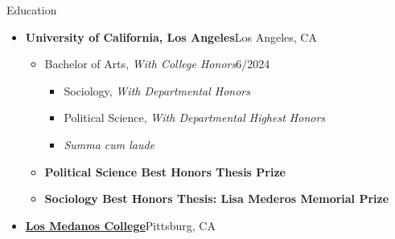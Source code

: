 \documentclass[12pt]{resume} %
\begin{document}
\begin{rSection}{Education}
\begin{itemize}[leftmargin=0em, itemsep=0pt]
\item[] \textbf{University of California, Los Angeles}\hfill{}Los Angeles, CA
\begin{itemize}[leftmargin=1em, itemsep=0pt]
    \item[] Bachelor of Arts, \textit{With College Honors}\hfill{}6/2024
    \begin{itemize}[leftmargin=1em, itemsep=0pt]
        \item[] Sociology, \textit{With Departmental Honors}
        \item[] Political Science, \textit{With Departmental Highest Honors}
    \item[] \textit{Summa cum laude}
    \end{itemize}
    \vspace{6pt}
\item[] \textbf{Political Science Best Honors Thesis Prize}
\vspace{6pt}
\item[] \textbf{Sociology Best Honors Thesis: Lisa Mederos Memorial Prize}
\end{itemize}
\vspace{12pt}
\item[] \textbf{\href{https://www.losmedanos.edu/}{Los Medanos College}}\hfill{}Pittsburg, CA

\end{itemize}
\end{rSection}
\end{document}
